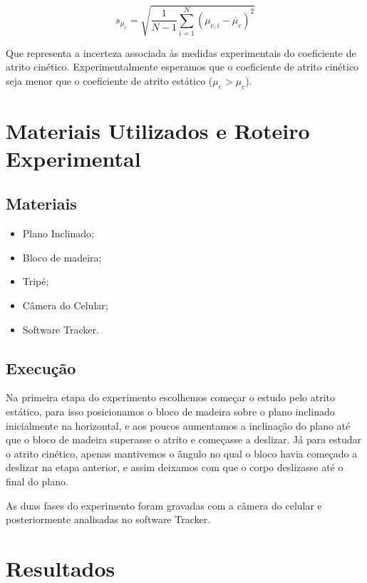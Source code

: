 \documentclass[12pt,a4paper]{article}
\begin{document}
\begin{equation}\label{eq:desvio_padrao}
s_{\mu_c} = \sqrt{\frac{1}{N-1}\sum_{i=1}^{N}(\mu_{c,i} - \overline{\mu}_c)^2}
\end{equation}

Que representa a incerteza associada às medidas experimentais do
coeficiente de atrito cinético. Experimentalmente esperamos que o
coeficiente de atrito cinético seja menor que o coeficiente de atrito
estático (\(\mu_e > \mu_c\)).

\section{Materiais Utilizados e Roteiro Experimental}

\subsection{Materiais}

\begin{itemize}
\item Plano Inclinado;
\item Bloco de madeira;
\item Tripé;
\item Câmera do Celular;
\item Software Tracker.
\end{itemize}

\subsection{Execução}

Na primeira etapa do experimento escolhemos começar o estudo pelo atrito
estático, para isso posicionamos o bloco de madeira sobre o plano
inclinado inicialmente na horizontal, e aos poucos aumentamos a
inclinação do plano até que o bloco de madeira superasse o atrito e
começasse a deslizar. Já para estudar o atrito cinético, apenas
mantivemos o ângulo no qual o bloco havia começado a deslizar na etapa
anterior, e assim deixamos com que o corpo deslizasse até o final do
plano.

As duas fases do experimento foram gravadas com a câmera do celular e
posteriormente analisadas no software Tracker.

\section{Resultados}
\end{document}
